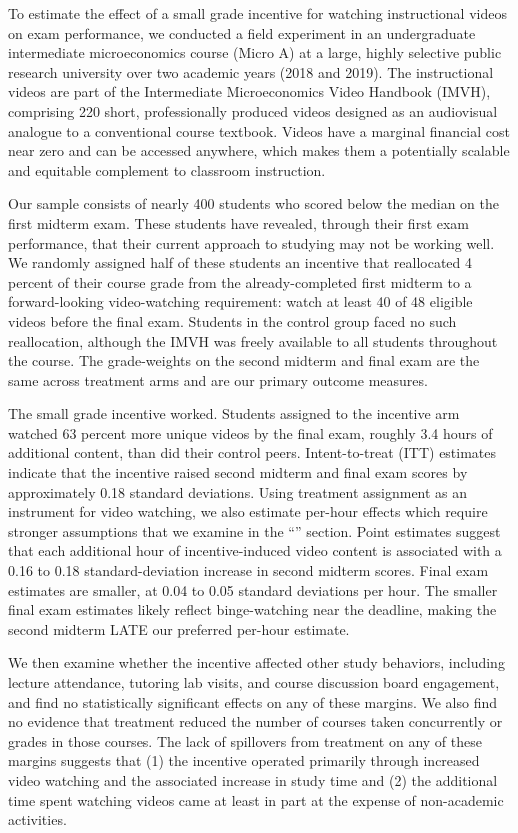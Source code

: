 To estimate the effect of a small grade incentive for watching instructional videos on exam performance, we conducted a field experiment in an undergraduate intermediate microeconomics course (Micro A) at a large, highly selective public research university over two academic years (2018 and 2019).
The instructional videos are part of the Intermediate Microeconomics Video Handbook (IMVH), comprising 220 short, professionally produced videos designed as an audiovisual analogue to a conventional course textbook.
Videos have a marginal financial cost near zero and can be accessed anywhere, which makes them a potentially scalable and equitable complement to classroom instruction.

Our sample consists of nearly 400 students who scored below the median on the first midterm exam.
These students have revealed, through their first exam performance, that their current approach to studying may not be working well.
We randomly assigned half of these students an incentive that reallocated 4 percent of their course grade from the already-completed first midterm to a forward-looking video-watching requirement: watch at least 40 of 48 eligible videos before the final exam.
Students in the control group faced no such reallocation, although the IMVH was freely available to all students throughout the course.
The grade-weights on the second midterm and final exam are the same across treatment arms and are our primary outcome measures.

The small grade incentive worked.
Students assigned to the incentive arm watched 63 percent more unique videos by the final exam, roughly 3.4 hours of additional content, than did their control peers.
Intent-to-treat (ITT) estimates indicate that the incentive raised second midterm and final exam scores by approximately 0.18 standard deviations.
Using treatment assignment as an instrument for video watching, we also estimate per-hour effects which require stronger assumptions that we examine in the ``'' section.
Point estimates suggest that each additional hour of incentive-induced video content is associated with a 0.16 to 0.18 standard-deviation increase in second midterm scores.
Final exam estimates are smaller, at 0.04 to 0.05 standard deviations per hour.
The smaller final exam estimates likely reflect binge-watching near the deadline, making the second midterm LATE our preferred per-hour estimate.

We then examine whether the incentive affected other study behaviors, including lecture attendance, tutoring lab visits, and course discussion board engagement, and find no statistically significant effects on any of these margins.
We also find no evidence that treatment reduced the number of courses taken concurrently or grades in those courses.
The lack of spillovers from treatment on any of these margins suggests that (1) the incentive operated primarily through increased video watching and the associated increase in study time and (2) the additional time spent watching videos came at least in part at the expense of non-academic activities.


